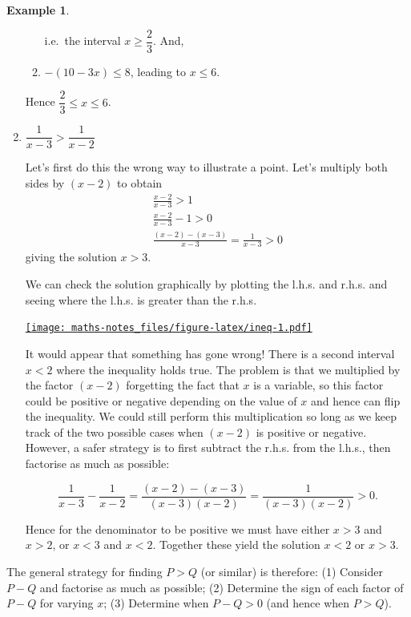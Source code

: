 \documentclass[
]{book}
\theoremstyle{definition}
\theoremstyle{definition}
\newtheorem{example}{Example}[chapter]
\theoremstyle{definition}
\theoremstyle{definition}
\theoremstyle{remark}
\begin{document}
\begin{example}
\begin{enumerate}
\begin{enumerate}
    i.e.~the interval \(x\geq\dfrac{2}{3}.\)
    And,
  \item
    \(-(10-3x)\leq 8\), leading to \(x\leq 6\).
  \end{enumerate}

  Hence \(\dfrac{2}{3}\leq x \leq 6\).
\item
  \(\dfrac{1}{x-3}>\dfrac{1}{x-2}\)

  Let's first do this the wrong way to illustrate a point. Let's multiply both sides by \((x-2)\) to obtain
  \begin{gather*}
   \frac{x-2}{x-3}>1\\
   \frac{x-2}{x-3}-1>0\\
   \frac{(x-2)-(x-3)}{x-3}=\frac{1}{x-3}>0
   \end{gather*}
  giving the solution \(x>3\).

  We can check the solution graphically by plotting the l.h.s. and r.h.s. and seeing where the l.h.s. is greater than the r.h.s.

  \href{https://www.desmos.com/calculator/ld9jyh4z3y?embed}{\texttt{[image: maths-notes\_files/figure-latex/ineq-1.pdf]}}

  It would appear that something has gone wrong! There is a second interval \(x<2\) where the inequality holds true. The problem is that we multiplied by the factor \((x-2)\) forgetting the fact that \(x\) is a variable, so this factor could be positive or negative depending on the value of \(x\) and hence can flip the inequality. We could still perform this multiplication so long as we keep track of the two possible cases when \((x-2)\) is positive or negative. However, a safer strategy is to first subtract the r.h.s. from the l.h.s., then factorise as much as possible:

  \[\frac{1}{x-3}-\frac{1}{x-2}=\frac{(x-2)-(x-3)}{(x-3)(x-2)}=\frac{1}{(x-3)(x-2)}>0.\]

  Hence for the denominator to be positive we must have either \(x>3\) and \(x>2\), or \(x<3\) and \(x<2\). Together these yield the solution \(x<2\) or \(x>3\).
\end{enumerate}

\end{example}

The general strategy for finding \(P>Q\) (or similar) is therefore: (1) Consider \(P-Q\) and factorise as much as possible; (2) Determine the sign of each factor of \(P-Q\) for varying \(x\); (3) Determine when \(P-Q>0\) (and hence when \(P>Q\)).
\end{document}
